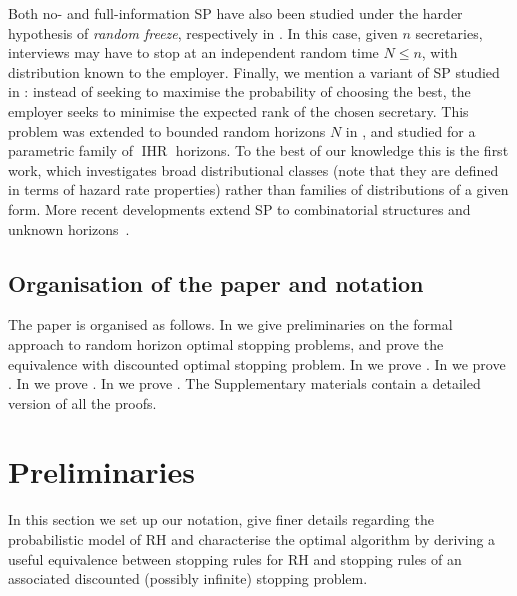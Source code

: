 \documentclass[11pt, a4paper, twoside]{article}
\DeclareMathOperator{\IHR}{IHR}
\numberwithin{equation}{section}
\begin{document}
	Both no- and full-information SP have also been studied under the harder hypothesis of \textit{random freeze}, respectively in \cite{Sam95,Sam96}. In this case, given $n$ secretaries, interviews may have to stop  at an independent random time $N\le n$, with distribution known to the employer. Finally, we mention a variant of SP studied in \cite{ChoMorRobSam64}: instead of seeking to maximise the probability of choosing the best, the employer seeks to minimise the expected rank of the chosen secretary. This problem was extended to bounded random horizons $N$ in \cite{Gia79}, and studied for a parametric family of $\IHR$ horizons. To the best of our knowledge this is the first work, which investigates broad distributional classes (note that they are defined in terms of hazard rate properties) rather than families of distributions of a given form. More recent developments extend SP to combinatorial structures and unknown horizons~\cite{HoefKod17,GharVon13}.
	
	\subsection{Organisation of the paper and notation}
	
	The paper is organised as follows. In  we give preliminaries on the formal approach to random horizon optimal stopping problems, and prove the equivalence with discounted optimal stopping problem. In  we prove .  In  we prove . In  we prove . In  we prove . The Supplementary materials contain a detailed version of all the proofs.
	
	\section{Preliminaries}\label{opt}
	In this section we set up our notation, give finer details regarding the probabilistic model of RH and characterise the optimal algorithm by deriving a useful equivalence between stopping rules for RH and stopping rules of an associated discounted (possibly infinite) stopping problem.
	
\end{document}
